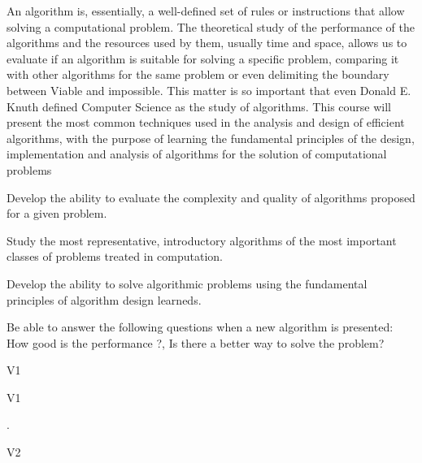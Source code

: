 \begin{syllabus}


\begin{justification}
An algorithm is, essentially, a well-defined set of rules or instructions that allow solving a computational problem.
The theoretical study of the performance of the algorithms and the resources used by them, usually time and space, allows us to evaluate if an algorithm is suitable for solving a specific problem, comparing it with other algorithms for the same problem or even delimiting the boundary between Viable and impossible.
This matter is so important that even Donald E. Knuth defined Computer Science as the study of algorithms.
This course will present the most common techniques used in the analysis and design of efficient algorithms,
with the purpose of learning the fundamental principles of the design, implementation and analysis of algorithms for the solution of computational problems
\end{justification}

\begin{goals} 
\item Develop the ability to evaluate the complexity and quality of algorithms proposed for a given problem.
\item Study the most representative, introductory algorithms of the most important classes of problems treated in computation.
\item Develop the ability to solve algorithmic problems using the fundamental principles of algorithm design learneds.
\item Be able to answer the following questions when a new algorithm is presented: How good is the performance ?, Is there a better way to solve the problem?
\end{goals}

\begin{outcomes}{V1}
    \item {} 
    \item {} 
\end{outcomes}

\begin{specificoutcomes}{V1}
    \item {}
    \item {}
    \item {}
    \item {}
    \item {}
\end{specificoutcomes}
.
\begin{outcomes}{V2}
    \item {} 
    \item {} 
\end{outcomes}


\end{syllabus}

